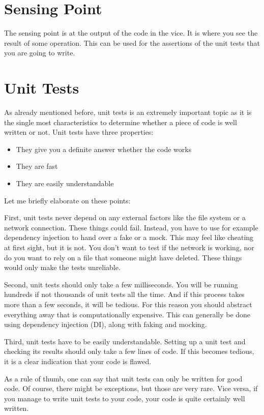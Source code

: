 \section{Sensing Point}

The sensing point is at the output of the code in the vice. It is where you see the result of some operation. This can be used for the assertions of the unit tests that you are going to write.

\section{Unit Tests}

As already mentioned before, unit tests is an extremely important topic as it is the single most characteristics to determine whether a piece of code is well written or not. Unit tests have three properties:

\begin{itemize}
\item They give you a definite answer whether the code works
\item They are fast
\item They are easily understandable
\end{itemize}

Let me briefly elaborate on these points:

First, unit tests never depend on any external factors like the file system or a network connection. These things could fail. Instead, you have to use for example dependency injection to hand over a fake or a mock. This may feel like cheating at first sight, but it is not. You don't want to test if the network is working, nor do you want to rely on a file that someone might have deleted. These things would only make the tests unreliable.

Second, unit tests should only take a few milliseconds. You will be running hundreds if not thousands of unit tests all the time. And if this process takes more than a few seconds, it will be tedious. For this reason you should abstract everything away that is computationally expensive. This can generally be done using dependency injection (DI), along with faking and mocking.

Third, unit tests have to be easily understandable. Setting up a unit test and checking its results should only take a few lines of code. If this becomes tedious, it is a clear indication that your code is flawed.

As a rule of thumb, one can say that unit tests can only be written for good code. Of course, there might be exceptions, but those are very rare. Vice versa, if you manage to write unit tests to your code, your code is quite certainly well written.

